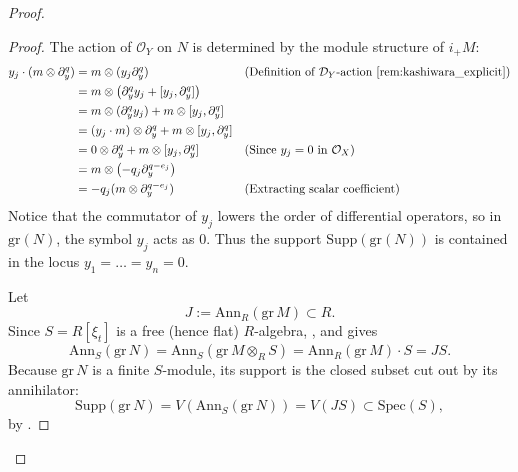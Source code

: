 \begin{proof}
\begin{proof}
        The action of $\mathcal{O}_Y$ on $N$ is determined by the module structure of $i_+M$:
        \begin{align*}
            y_j \cdot (m \otimes \partial_y^q)
             & = m \otimes (y_j \partial_y^q)                                       &  & \text{(Definition of $\mathcal{D}_Y$-action \ref{rem:kashiwara_explicit})} \\
             & = m \otimes \left( \partial_y^q y_j + [y_j, \partial_y^q] \right)                                                                                    \\
             & = m \otimes (\partial_y^q y_j) + m \otimes [y_j, \partial_y^q]                                                                                       \\
             & = (y_j \cdot m) \otimes \partial_y^q + m \otimes [y_j, \partial_y^q]                                                                                 \\
             & = 0 \otimes \partial_y^q + m \otimes [y_j, \partial_y^q]             &  & \text{(Since $y_j = 0$ in $\mathcal{O}_X$)}                                \\
             & = m \otimes \left( -q_j \partial_y^{q-e_j} \right)                                                                                                   \\
             & = -q_j (m \otimes \partial_y^{q-e_j})                                &  & \text{(Extracting scalar coefficient)}
        \end{align*}
        Notice that the commutator of $y_j$ lowers the order of differential operators, so in $\mathrm{gr}(N)$, the symbol $y_j$ acts as $0$. Thus the support $\mathrm{Supp}(\mathrm{gr}(N))$ is contained in the locus $y_1 = \dots = y_n = 0$.

        Let
        \[
            J:=\mathrm{Ann}_R(\mathrm{gr}\,M)\subset R.
        \]
        Since $S=R[\xi_t]$ is a free (hence flat) $R$-algebra,
        \cite[\href{https://stacks.math.columbia.edu/tag/0250}{Tag 0250}]{stacks-project},
        and \cite[\href{https://stacks.math.columbia.edu/tag/07T8}{Tag 07T8}]{stacks-project} gives
        \[
            \mathrm{Ann}_S(\mathrm{gr}\,N)
            =\mathrm{Ann}_S(\mathrm{gr}\,M\otimes_RS)
            =\mathrm{Ann}_R(\mathrm{gr}\,M)\cdot S
            =JS.
        \]
        Because $\mathrm{gr}\,N$ is a finite $S$-module, its support is the closed subset cut out by its annihilator:
        \[
            \mathrm{Supp}(\mathrm{gr}\,N)=V(\mathrm{Ann}_S(\mathrm{gr}\,N))=V(JS)\subset \mathrm{Spec}(S),
        \]
        by
        \cite[\href{https://stacks.math.columbia.edu/tag/00L2}{Tag 00L2}]{stacks-project}.


\end{proof}
\end{proof}
